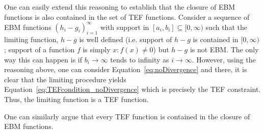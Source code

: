 \documentclass{article}
\begin{document}
One can easily extend this reasoning to establish that the closure
of EBM functions is also contained in the set of TEF functions. Consider
a sequence of EBM functions $(h_{i}-g_{i})_{i=1}^{\infty}$ with support
in $[a_{i},b_{i}]\subseteq[0,\infty)$ such that the limiting function, $h-g$
is well defined (i.e. support of $h-g$ is contained in $[0,\infty)$; support of a function $f$ is simply ${x:f(x)\neq 0}$) but $h-g$ is not EBM. The only way this can happen is if $b_{i}\to\infty$
tends to infinity as $i\to\infty$. However, using the reasoning above,
one can consider Equation~\eqref{eq:noDivergence} and there, it is clear that
the limiting procedure yields Equation~\eqref{eq:TEFcondition_noDivergence} which
is precisely the TEF constraint. Thus, the limiting function is a
TEF function.

One can similarly argue that every TEF function is contained in the
closure of EBM functions.
\end{document}
